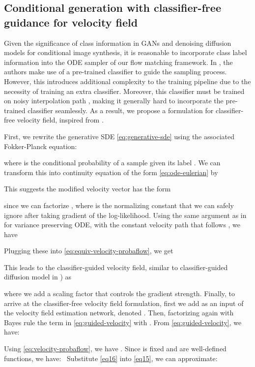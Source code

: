 \documentclass{article}
\theoremstyle{plain}
\theoremstyle{definition}
\theoremstyle{remark}
\begin{document}
\subsection{Conditional generation with classifier-free guidance for velocity field}
Given the significance of class information  in GANs \cite{brock2018large,mirza2014conditional} and denoising diffusion models \cite{dhariwal2021diffusion,ho2022cdm,ho2022classifier,zheng2023eds} for conditional image synthesis, it is reasonable to incorporate class label information into the ODE sampler of our flow matching framework.
In \cite{dhariwal2021diffusion}, the authors make use of a pre-trained classifier  to guide the sampling process.
However, this introduces additional complexity to the training pipeline due to the necessity of training an extra classifier.
Moreover, this classifier must be trained on noisy interpolation path , making it generally hard to incorporate the pre-trained classifier seamlessly.
As a result, we propose a formulation for classifier-free velocity field, inspired from \cite{ho2022classifier}.

First, we rewrite the generative SDE \eqref{eq:generative-sde} using the associated Fokker-Planck equation:

where  is the conditional probability of a sample given its label .
We can transform this into continuity equation of the form \eqref{eq:ode-eulerian} by

This suggests the modified velocity vector has the form

since we can factorize , where  is the normalizing constant that we can safely ignore after taking gradient of the log-likelihood.
Using the same argument as in \cite{kingma2021variational} for variance preserving ODE, with the constant velocity path  that follows , we have

Plugging these into \eqref{eq:equiv-velocity-probaflow}, we get

This leads to the classifier-guided velocity field, similar to classifier-guided diffusion model in \cite{dhariwal2021diffusion}) as

where we add a scaling factor  that controls the gradient strength.
Finally, to arrive at the classifier-free velocity field formulation, first we add  as an input of the velocity field estimation network, denoted . Then, factorizing again with Bayes rule the term  in \eqref{eq:guided-velocity} with . From \eqref{eq:guided-velocity}, we have:

Using \eqref{eq:velocity-probaflow}, we have . Since  is fixed and  are well-defined functions, we have:
\
Substitute \eqref{eq16} into \eqref{eq15}, we can approximate:
\end{document}
